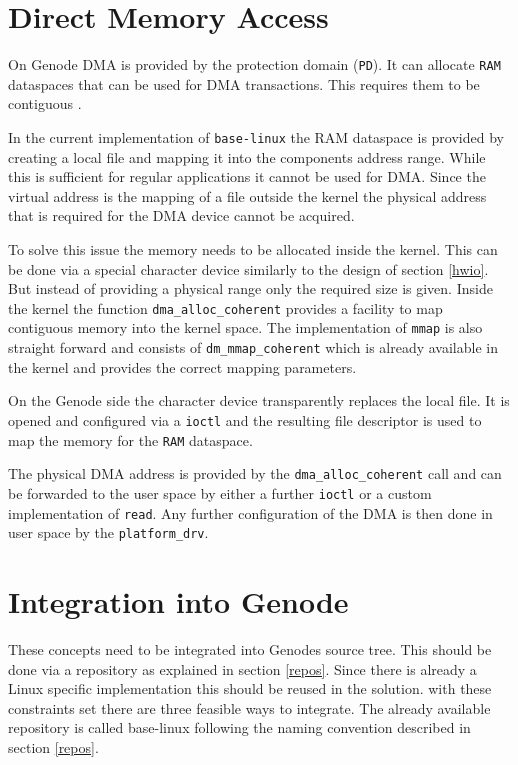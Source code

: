 \documentclass[
a4paper,
11pt,
twoside
]{report}
\begin{document}
		\section{Direct Memory Access}
		
		On Genode DMA is provided by the protection domain (\texttt{PD}).
		It can allocate \texttt{RAM} dataspaces that can be used for DMA transactions.
		This requires them to be contiguous \citep{genode}.
		
		In the current implementation of \texttt{base-linux} the RAM dataspace is provided by creating a local file and mapping it into the components address range.
		While this is sufficient for regular applications it cannot be used for DMA.
		Since the virtual address is the mapping of a file outside the kernel the physical address that is required for the DMA device cannot be acquired.
		
		To solve this issue the memory needs to be allocated inside the kernel.
		This can be done via a special character device similarly to the design of section \ref{hwio}.
		But instead of providing a physical range only the required size is given.
		Inside the kernel the function \texttt{dma\_alloc\_coherent} provides a facility to map contiguous memory into the kernel space.
		The implementation of \texttt{mmap} is also straight forward and consists of \texttt{dm\_mmap\_coherent} which is already available in the kernel and provides the correct mapping parameters. \citep{books/daglib/0012446}
		
		On the Genode side the character device transparently replaces the local file.
		It is opened and configured via a \texttt{ioctl} and the resulting file descriptor is used to map the memory for the \texttt{RAM} dataspace.
		
		The physical DMA address is provided by the \texttt{dma\_alloc\_coherent} call and can be forwarded to the user space by either a further \texttt{ioctl} or a custom implementation of \texttt{read}.
		Any further configuration of the DMA is then done in user space by the \texttt{platform\_drv}.
		
		\section{Integration into Genode}
		
		These concepts need to be integrated into Genodes source tree.
		This should be done via a repository as explained in section \ref{repos}.
		Since there is already a Linux specific implementation this should be reused in the solution.
		with these constraints set there are three feasible ways to integrate.
		The already available repository is called base-linux following the naming convention described in section \ref{repos}.
		
\end{document}
